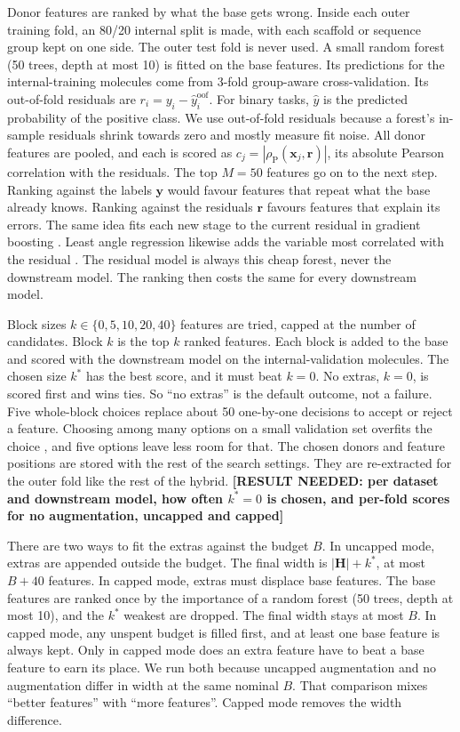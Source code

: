 Donor features are ranked by what the base gets wrong. Inside each outer training fold, an 80/20 internal split is made, with each scaffold or sequence group kept on one side. The outer test fold is never used. A small random forest (50 trees, depth at most 10) is fitted on the base features. Its predictions for the internal-training molecules come from 3-fold group-aware cross-validation. Its out-of-fold residuals are $r_i = y_i - \hat{y}^{\mathrm{oof}}_i$. For binary tasks, $\hat{y}$ is the predicted probability of the positive class. We use out-of-fold residuals because a forest's in-sample residuals shrink towards zero and mostly measure fit noise. All donor features are pooled, and each is scored as $c_j = |\rho_{\mathrm{P}}(\mathbf{x}_j, \mathbf{r})|$, its absolute Pearson correlation with the residuals. The top $M = 50$ features go on to the next step. Ranking against the labels $\mathbf{y}$ would favour features that repeat what the base already knows. Ranking against the residuals $\mathbf{r}$ favours features that explain its errors. The same idea fits each new stage to the current residual in gradient boosting \citep{friedman2001greedy}. Least angle regression likewise adds the variable most correlated with the residual \citep{efron2004lars}. The residual model is always this cheap forest, never the downstream model. The ranking then costs the same for every downstream model.

Block sizes $k \in \{0, 5, 10, 20, 40\}$ features are tried, capped at the number of candidates. Block $k$ is the top $k$ ranked features. Each block is added to the base and scored with the downstream model on the internal-validation molecules. The chosen size $k^*$ has the best score, and it must beat $k=0$. No extras, $k=0$, is scored first and wins ties. So ``no extras'' is the default outcome, not a failure. Five whole-block choices replace about 50 one-by-one decisions to accept or reject a feature. Choosing among many options on a small validation set overfits the choice \citep{Cawley2010}, and five options leave less room for that. The chosen donors and feature positions are stored with the rest of the search settings. They are re-extracted for the outer fold like the rest of the hybrid. \textbf{[RESULT NEEDED: per dataset and downstream model, how often $k^*=0$ is chosen, and per-fold scores for no augmentation, uncapped and capped]}

There are two ways to fit the extras against the budget $B$. In uncapped mode, extras are appended outside the budget. The final width is $|\mathbf{H}| + k^*$, at most $B + 40$ features. In capped mode, extras must displace base features. The base features are ranked once by the importance of a random forest (50 trees, depth at most 10), and the $k^*$ weakest are dropped. The final width stays at most $B$. In capped mode, any unspent budget is filled first, and at least one base feature is always kept. Only in capped mode does an extra feature have to beat a base feature to earn its place. We run both because uncapped augmentation and no augmentation differ in width at the same nominal $B$. That comparison mixes ``better features'' with ``more features''. Capped mode removes the width difference.

